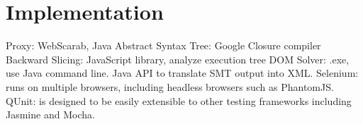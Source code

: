\section{Implementation}

Proxy: WebScarab, Java
Abstract Syntax Tree: Google Closure compiler
Backward Slicing: JavaScript library, analyze execution tree
DOM Solver: .exe, use Java command line.  Java API to translate SMT output into XML.  
Selenium: runs on multiple browsers, including headless browsers such as PhantomJS.  
QUnit:  \tool is designed to be easily extensible to other testing frameworks including Jasmine and Mocha.






